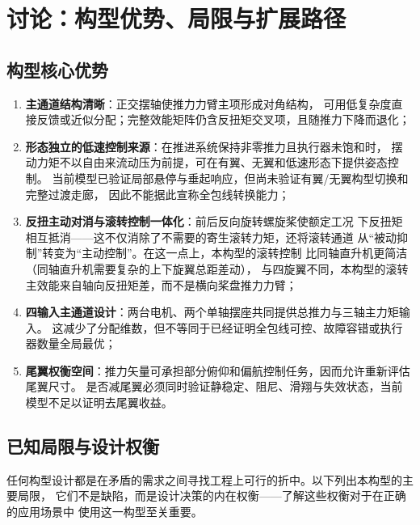 \section{讨论：构型优势、局限与扩展路径}
\label{sec:discussion}

\subsection{构型核心优势}

\begin{enumerate}[label=(\arabic*)]
    \item \textbf{主通道结构清晰}：正交摆轴使推力力臂主项形成对角结构，
          可用低复杂度直接反馈或近似分配；完整效能矩阵仍含反扭矩交叉项，且随推力下降而退化；
    \item \textbf{形态独立的低速控制来源}：在推进系统保持非零推力且执行器未饱和时，
          摆动力矩不以自由来流动压为前提，可在有翼、无翼和低速形态下提供姿态控制。
          当前模型已验证局部悬停与垂起响应，但尚未验证有翼/无翼构型切换和完整过渡走廊，
          因此不能据此宣称全包线转换能力；
    \item \textbf{反扭主动对消与滚转控制一体化}：前后反向旋转螺旋桨使额定工况
          下反扭矩相互抵消——这不仅消除了不需要的寄生滚转力矩，还将滚转通道
          从“被动抑制”转变为“主动控制”。在这一点上，本构型的滚转控制
          比同轴直升机更简洁（同轴直升机需要复杂的上下旋翼总距差动），
          与四旋翼不同，本构型的滚转主效能来自轴向反扭矩差，而不是横向桨盘推力力臂；
    \item \textbf{四输入主通道设计}：两台电机、两个单轴摆座共同提供总推力与三轴主力矩输入。
          这减少了分配维数，但不等同于已经证明全包线可控、故障容错或执行器数量全局最优；
    \item \textbf{尾翼权衡空间}：推力矢量可承担部分俯仰和偏航控制任务，因而允许重新评估尾翼尺寸。
          是否减尾翼必须同时验证静稳定、阻尼、滑翔与失效状态，当前模型不足以证明去尾翼收益。
\end{enumerate}

\subsection{已知局限与设计权衡}

任何构型设计都是在矛盾的需求之间寻找工程上可行的折中。以下列出本构型的主要局限，
它们不是缺陷，而是设计决策的内在权衡——了解这些权衡对于在正确的应用场景中
使用这一构型至关重要。


